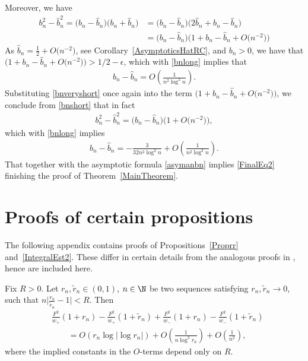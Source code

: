 Moreover, we have
\begin{align}\nonumber
 b_n^2-\widehat b_n^2 = \big(b_n-\widehat b_n\big)\big(b_n+\widehat b_n\big) &= \big(b_n-\widehat b_n\big)\big(2\widehat b_n + b_n-\widehat b_n\big)
 \\\label{bnshort}
 &=\big(b_n-\widehat b_n\big)\big(1 + b_n-\widehat b_n + O\big(n^{-2}\big)\big)
\end{align}
As $\widehat b_n = \frac{1}{2} + O\big(n^{-2}\big)$, see Corollary~\ref{AsymptoticsHatRC}, and $b_n > 0$, we have that $\big(1 + b_n-\widehat b_n + O\big(n^{-2}\big)\big)>1/2-\epsilon$, which with \eqref{bnlong} implies that
\begin{align}\label{bnveryshort}
 b_n-\widehat b_n = O\left(\frac{1}{n^2\log^2 n}\right).
\end{align}
Substituting \eqref{bnveryshort} once again into the term $\big(1 + b_n-\widehat b_n + O\big(n^{-2}\big)\big)$, we conclude from \eqref{bnshort} that in fact
\begin{align*}
 b_n^2-\widehat b_n^2 = \big(b_n-\widehat b_n\big)\big(1+O\big(n^{-2}\big)\big),
\end{align*}
which with \eqref{bnlong} implies
\begin{align*}
 b_n-\widehat b_n = -\frac{3}{32n^2\log^2 n} + O\left(\frac{1}{n^2\log^3 n}\right).
\end{align*}
That together with the asymptotic formula \eqref{asymanbn} implies \eqref{FinalEq2} finishing the proof of Theorem~\ref{MainTheorem}.

\appendix
\section{Proofs of certain propositions}\label{appendixA}

The following appendix contains proofs of Propositions~\ref{Proprr} and~\ref{IntegralEst2}. These differ in certain details from the analogous proofs in \cite{CD}, hence are included here.
\begin{Proposition} \label{ProprrAp}
Fix $R > 0$. Let $r_n, \tilde r_n \in (0,1)$, $n \in \N$ be two sequences satisfying $r_n, \tilde r_n \to 0$, such that $n\big|\frac{r_n}{\tilde r_n}-1|< R$. Then
\begin{align*}%
 &\frac{F^2}{w_+}(1+r_n)-\frac{F^2}{w_+}(1+\tilde r_n)+\frac{F^2}{w_-}(1+r_n)-\frac{F^2}{w_-}(1+\tilde r_n)
 \\
 &\qquad= O(r_n \log |\log r_n|) + O\left(\frac{1}{n\log^3 r_n}\right) + O\left(\frac{1}{n^2}\right),
\end{align*}
where the implied constants in the $O$-terms depend only on $R$.
\end{Proposition}

